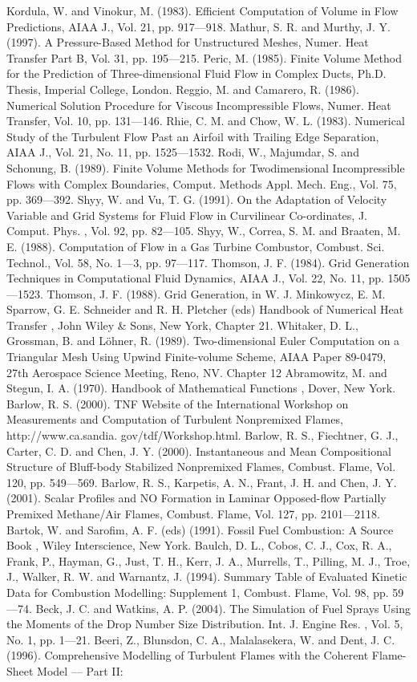 \documentclass[11pt,a4paper,openany,fontset=none]{ctexbook}
\begin{document}
\begin{sloppypar}
{\small Kordula, W. and Vinokur, M. (1983). Efficient Computation of Volume in Flow Predictions, AIAA J., Vol. 21, pp. 917—918. Mathur, S. R. and Murthy, J. Y. (1997). A Pressure-Based Method for Unstructured Meshes, Numer. Heat Transfer Part B, Vol. 31, pp. 195—215. Peric, M. (1985). Finite Volume Method for the Prediction of Three-dimensional Fluid Flow in Complex Ducts, Ph.D. Thesis, Imperial College, London. Reggio, M. and Camarero, R. (1986). Numerical Solution Procedure for Viscous Incompressible Flows, Numer. Heat Transfer, Vol. 10, pp. 131—146. Rhie, C. M. and Chow, W. L. (1983). Numerical Study of the Turbulent Flow Past an Airfoil with Trailing Edge Separation, AIAA J., Vol. 21, No. 11, pp. 1525—1532. Rodi, W., Majumdar, S. and Schonung, B. (1989). Finite Volume Methods for Twodimensional Incompressible Flows with Complex Boundaries, Comput. Methods Appl. Mech. Eng., Vol. 75, pp. 369—392. Shyy, W. and Vu, T. G. (1991). On the Adaptation of Velocity Variable and Grid Systems for Fluid Flow in Curvilinear Co-ordinates, J. Comput. Phys. , Vol. 92, pp. 82—105. Shyy, W., Correa, S. M. and Braaten, M. E. (1988). Computation of Flow in a Gas Turbine Combustor, Combust. Sci. Technol., Vol. 58, No. 1—3, pp. 97—117. Thomson, J. F. (1984). Grid Generation Techniques in Computational Fluid Dynamics, AIAA J., Vol. 22, No. 11, pp. 1505—1523. Thomson, J. F. (1988). Grid Generation, in W. J. Minkowycz, E. M. Sparrow, G. E. Schneider and R. H. Pletcher (eds) Handbook of Numerical Heat Transfer , John Wiley \& Sons, New York, Chapter 21. Whitaker, D. L., Grossman, B. and Löhner, R. (1989). Two-dimensional Euler Computation on a Triangular Mesh Using Upwind Finite-volume Scheme, AIAA Paper 89-0479, 27th Aerospace Science Meeting, Reno, NV. Chapter 12 Abramowitz, M. and Stegun, I. A. (1970). Handbook of Mathematical Functions , Dover, New York. Barlow, R. S. (2000). TNF Website of the International Workshop on Measurements and Computation of Turbulent Nonpremixed Flames, http://www.ca.sandia. gov/tdf/Workshop.html. Barlow, R. S., Fiechtner, G. J., Carter, C. D. and Chen, J. Y. (2000). Instantaneous and Mean Compositional Structure of Bluff-body Stabilized Nonpremixed Flames, Combust. Flame, Vol. 120, pp. 549—569. Barlow, R. S., Karpetis, A. N., Frant, J. H. and Chen, J. Y. (2001). Scalar Profiles and NO Formation in Laminar Opposed-flow Partially Premixed Methane/Air Flames, Combust. Flame, Vol. 127, pp. 2101—2118. Bartok, W. and Sarofim, A. F. (eds) (1991). Fossil Fuel Combustion: A Source Book , Wiley Interscience, New York. Baulch, D. L., Cobos, C. J., Cox, R. A., Frank, P., Hayman, G., Just, T. H., Kerr, J. A., Murrells, T., Pilling, M. J., Troe, J., Walker, R. W. and Warnantz, J. (1994). Summary Table of Evaluated Kinetic Data for Combustion Modelling: Supplement 1, Combust. Flame, Vol. 98, pp. 59—74. Beck, J. C. and Watkins, A. P. (2004). The Simulation of Fuel Sprays Using the Moments of the Drop Number Size Distribution. Int. J. Engine Res. , Vol. 5, No. 1, pp. 1—21. Beeri, Z., Blunsdon, C. A., Malalasekera, W. and Dent, J. C. (1996). Comprehensive Modelling of Turbulent Flames with the Coherent Flame-Sheet Model — Part II:}\par

\end{sloppypar}
\end{document}
